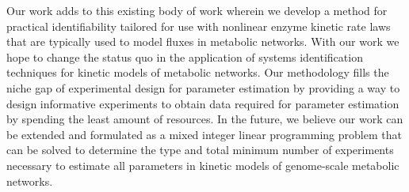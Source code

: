 \documentclass[10pt]{article}
\begin{document}
	Our work adds to this existing body of work wherein we develop a method for practical identifiability tailored for use with nonlinear enzyme kinetic rate laws that are typically used to model fluxes in metabolic networks. With our work we hope to change the status quo in the application of systems identification techniques for kinetic models of metabolic networks. Our methodology fills the niche gap of experimental design for parameter estimation by providing a way to design informative experiments to obtain data required for parameter estimation by spending the least amount of resources.	
	In the future, we believe our work can be extended and formulated as a mixed integer linear programming problem that can be solved to determine the type and total minimum number of experiments necessary to estimate all parameters in kinetic models of genome-scale metabolic networks.
	
	
	
\end{document}
